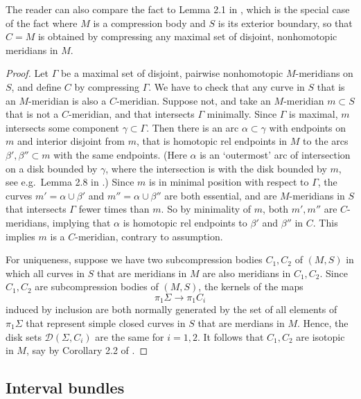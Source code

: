 \documentclass[12pt]{amsart}
\theoremstyle{definition}
\theoremstyle{remark}
\begin{document}
The reader can also compare the fact to Lemma 2.1 in \cite{Biringerautomorphisms}, which is the special case of the fact where $M$ is a compression body and $S$ is its exterior boundary, so that  $C=M$ is obtained by compressing any maximal set of disjoint, nonhomotopic meridians in $M$. 

\begin{proof} Let $\Gamma$ be a maximal set of disjoint, pairwise nonhomotopic $M$-meridians on $S$, and define $C$ by compressing $\Gamma$. We have to check that any curve in $S$ that is an $M$-meridian is also a $C$-meridian. Suppose not, and take an $M$-meridian $m\subset S$ that is not a $C$-meridian, and that intersects $\Gamma$ minimally. Since $\Gamma$ is maximal, $m$ intersects some component $\gamma\subset \Gamma$. Then there is an arc $\alpha \subset \gamma$ with endpoints on $m$ and interior disjoint from $m$, that is homotopic rel endpoints in $M$ to the arcs $\beta',\beta'' \subset m$ with the same endpoints. (Here $\alpha$ is an `outermost' arc of intersection on a disk bounded by $\gamma$, where the intersection is with the disk bounded by $m$, see e.g.\ Lemma 2.8 in \cite{Biringerautomorphisms}.) Since $m$ is in minimal position with respect to $\Gamma$, the curves $m' = \alpha \cup \beta'$ and $m''=\alpha\cup \beta''$ are both essential, and are $M$-meridians in $S$ that intersects $\Gamma$ fewer times than $m$. So by minimality of $m$, both $m',m''$ are $C$-meridians, implying that $\alpha$ is homotopic rel endpoints to $\beta'$ and $\beta''$ in $C$. This implies $m$ is a $C$-meridian, contrary to assumption. 

For uniqueness, suppose we have two subcompression bodies $C_1,C_2$ of $(M,S)$ in which all curves in $S$ that are meridians in $M$ are also meridians in $C_1,C_2$. Since $C_1,C_2$ are subcompression bodies of $(M,S)$, the kernels of the maps
$$\pi_1 \Sigma \longrightarrow \pi_1 C_i$$
induced by inclusion are both normally generated by the set of all elements of $\pi_1 \Sigma$ that represent simple closed curves in $S$ that are merdians in $M$. Hence, the disk sets $\mathcal D(\Sigma,C_i)$ are the same for $i=1,2$. It follows that $C_1,C_2$ are isotopic in $M$, say by Corollary 2.2 of \cite{Biringerautomorphisms}.
\end{proof}

\subsection{Interval bundles}\label{sec:ibundle}
\end{document}
